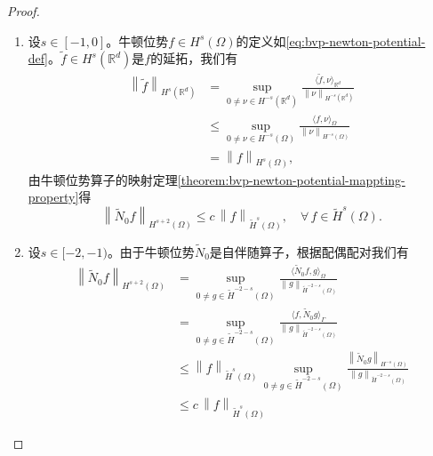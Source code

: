 \begin{proof}
  \begin{enumerate}
    \item 设$s \in [-1,0]$。牛顿位势$f \in H^{s}(\Omega)$的定义如\eqref{eq:bvp-newton-potential-def}。$\widetilde{f} \in H^{s}(\mathbb{R}^{d})$是$f$的延拓，我们有
    \begin{equation*}
      \begin{split}
        \left\| \widetilde{f} \right\|_{H^{s}(\mathbb{R}^{d})}
        & = \sup_{0 \neq \nu \in H^{-s}(\mathbb{R}^{d})}
        \frac{
        \langle \widetilde{f}, \nu \rangle_{\mathbb{R}^{d}}
        }{
        \left\| \nu \right\|_{H^{-s}(\mathbb{R}^{d})}
        } \\
        & \le \sup_{0 \neq \nu \in H^{-s}(\Omega)}
        \frac{
        \langle f, \nu \rangle_{\Omega}
        }{
        \left\| \nu \right\|_{H^{-s}(\Omega)}
        } \\
        & = \left\| f \right\|_{H^{s}(\Omega)},
      \end{split}
    \end{equation*}
    由牛顿位势算子的映射定理\ref{theorem:bvp-newton-potential-mappting-property}得
    \begin{equation*}
      \left\| \widetilde{N}_{0} f \right\|_{H^{s+2}(\Omega)}
      \le c \, \left\| f \right\|_{\widetilde{H}^{s}(\Omega)}, \quad \forall \, f \in \widetilde{H}^{s}(\Omega).
    \end{equation*}

    \item 设$s \in [-2,-1)$。由于牛顿位势$\widetilde{N}_{0}$是自伴随算子，根据配偶配对我们有
    \begin{equation*}
      \begin{split}
        \left\| \widetilde{N}_{0} f \right\|_{H^{s+2}(\Omega)}
        & = \sup_{0 \neq g \in \widetilde{H}^{-2 - s }(\Omega)}
        \frac{
        \langle \widetilde{N}_{0}f, g \rangle_{\Omega}
        }{
        \left\| g \right\|_{\widetilde{H}^{-2 - s }(\Omega)}
        }\\
        & = \sup_{0 \neq g \in \widetilde{H}^{-2 - s }(\Omega)}
        \frac{
        \langle f, \widetilde{N}_{0} g \rangle_{\Gamma}
        }{
        \left\| g \right\|_{\widetilde{H}^{-2 - s}(\Omega)}
        }\\
        & \le
        \left\| f \right\|_{\widetilde{H}^{s}(\Omega)} \,
        \sup_{0 \neq g \in \widetilde{H}^{-2 - s }(\Omega)}
        \frac{
        \left\| \widetilde{N}_{0} g \right\|_{H^{-s}(\Omega)}
        }{
        \left\| g \right\|_{\widetilde{H}^{-2 - s}(\Omega)}
        } \\
        & \le c \, \left\| f \right\|_{\widetilde{H}^{s}(\Omega)}
      \end{split}
    \end{equation*}
  \end{enumerate}
\end{proof}

